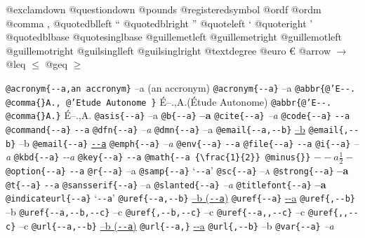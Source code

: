 \documentclass{book}
\begin{document}
@exclamdown \textexclamdown{}
@questiondown \textquestiondown{}
@pounds \textsterling{}
@registeredsymbol \circledR{}
@ordf \textordfeminine{}
@ordm \textordmasculine{}
@comma ,
@quotedblleft \textquotedblleft{}
@quotedblright \textquotedblright{}
@quoteleft \textquoteleft{}
@quoteright \textquoteright{}
@quotedblbase \quotedblbase{}
@quotesinglbase \quotesinglbase{}
@guillemetleft \guillemotleft{}
@guillemetright \guillemotright{}
@guillemotleft \guillemotleft{}
@guillemotright \guillemotright{}
@guilsinglleft \guilsinglleft{}
@guilsinglright \guilsinglright{}
@textdegree \textdegree{}
@euro \euro{}
@arrow $\rightarrow{}$
@leq $\leq{}$
@geq $\geq{}$

\texttt{@acronym\{{-}{-}a,an accronym\}} --a (an accronym)
\texttt{@acronym\{{-}{-}a\}} --a
\texttt{@abbr\{@'E{-}{-}. @comma\{\}A., @'Etude Autonome \}} \'{E}--.\@ ,A.\@ (\'{E}tude Autonome)
\texttt{@abbr\{@'E{-}{-}. @comma\{\}A.\}} \'{E}--.\@ ,A.\@
\texttt{@asis\{{-}{-}a\}} --a
\texttt{@b\{{-}{-}a\}} \textbf{--a}
\texttt{@cite\{{-}{-}a\}} \textit{--a}
\texttt{@code\{{-}{-}a\}} \texttt{{-}{-}a}
\texttt{@command\{{-}{-}a\}} \texttt{{-}{-}a}
\texttt{@dfn\{{-}{-}a\}} \emph{--a}
\texttt{@dmn\{{-}{-}a\}} --a
\texttt{@email\{{-}{-}a,{-}{-}b\}} \href{mailto:--a}{--b}
\texttt{@email\{,{-}{-}b\}} --b
\texttt{@email\{{-}{-}a\}} \href{mailto:--a}{\nolinkurl{--a}}
\texttt{@emph\{{-}{-}a\}} \emph{--a}
\texttt{@env\{{-}{-}a\}} \texttt{{-}{-}a}
\texttt{@file\{{-}{-}a\}} \texttt{{-}{-}a}
\texttt{@i\{{-}{-}a\}} \textit{--a}
\texttt{@kbd\{{-}{-}a\}} {\ttfamily\textsl{{-}{-}a}}
\texttt{@key\{{-}{-}a\}} \texttt{{-}{-}a}
\texttt{@math\{{-}{-}a \{\textbackslash{}frac\{1\}\{2\}\} @minus\{\}\}} $--a {\frac{1}{2}} -$
\texttt{@option\{{-}{-}a\}} \texttt{{-}{-}a}
\texttt{@r\{{-}{-}a\}} \textrm{--a}
\texttt{@samp\{{-}{-}a\}} `\texttt{{-}{-}a}'
\texttt{@sc\{{-}{-}a\}} \textsc{--a}
\texttt{@strong\{{-}{-}a\}} \textbf{--a}
\texttt{@t\{{-}{-}a\}} \texttt{{-}{-}a}
\texttt{@sansserif\{{-}{-}a\}} \textsf{--a}
\texttt{@slanted\{{-}{-}a\}} \textsl{--a}
\texttt{@titlefont\{{-}{-}a\}} {\huge \bfseries --a}
\texttt{@indicateurl\{{-}{-}a\}} `\texttt{{-}{-}a}'
\texttt{@uref\{{-}{-}a,{-}{-}b\}} \href{--a}{--b (\nolinkurl{--a})}
\texttt{@uref\{{-}{-}a\}} \url{--a}
\texttt{@uref\{,{-}{-}b\}} --b
\texttt{@uref\{{-}{-}a,{-}{-}b,{-}{-}c\}} --c
\texttt{@uref\{,{-}{-}b,{-}{-}c\}} --c
\texttt{@uref\{{-}{-}a,,{-}{-}c\}} --c
\texttt{@uref\{,,{-}{-}c\}} --c
\texttt{@url\{{-}{-}a,{-}{-}b\}} \href{--a}{--b (\nolinkurl{--a})}
\texttt{@url\{{-}{-}a,\}} \url{--a}
\texttt{@url\{,{-}{-}b\}} --b
\texttt{@var\{{-}{-}a\}} \emph{--a}
\end{document}
